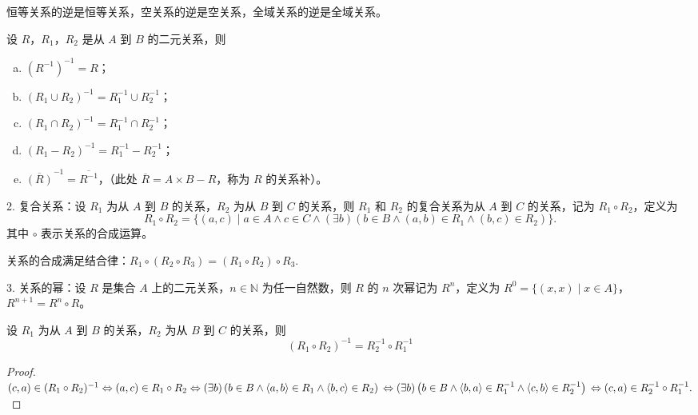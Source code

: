 \documentclass[normal,cyan]{elegantnote}
\begin{document}
\begin{note}
    恒等关系的逆是恒等关系，空关系的逆是空关系，全域关系的逆是全域关系。
\end{note}
\begin{theorem}
    设 $R$，$R_1$，$R_2$ 是从 $A$ 到 $B$ 的二元关系，则
    \begin{enumerate}[a)]
        \item $(R^{-1})^{-1} = R$；
        \item $(R_1 \cup R_2) ^{-1} = R_1^{-1} \cup R_2^{-1}$；
        \item $(R_1 \cap R_2) ^{-1} = R_1^{-1} \cap R_2^{-1}$；
        \item $(R_1 - R_2)^{-1} = R_1^{-1} - R_2^{-1}$；
        \item $\overline{(R)}^{-1} = \overline{R^{-1}}$，（此处 $\overline{R} = A \times B - R$，称为 $R$ 的{\color{red}关系补}）。
    \end{enumerate}
\end{theorem}
2. 复合关系：设 $R_1$ 为从 $A$ 到 $B$ 的关系，$R_2$ 为从 $B$ 到 $C$ 的关系，则 $R_1$ 和 $R_2$ 的{\color{red}复合关系}为从 $A$ 到 $C$ 的关系，记为 $R_1 \circ R_2$，定义为 $$R_1 \circ R_2 = \{(a, c) \mid a \in A \wedge c \in C \wedge (\exists b)(b \in B \wedge (a, b) \in R_1 \wedge (b, c) \in R_2)\}.$$ 其中 $\circ$ 表示{\color{red}关系的合成运算}。
\begin{note}
    关系的合成满足{\color{red}结合律}：$R_1 \circ (R_2 \circ R_3) = (R_1 \circ R_2) \circ R_3.$
\end{note}
3. 关系的幂：设 $R$ 是集合 $A$ 上的二元关系，$n \in \mathbb{N}$ 为任一自然数，则 $R$ 的 $n$ 次幂记为 $R^n$，定义为 $R^0 = \{(x, x) \mid x \in A\}$，$R^{n+1} = R^n \circ R$。
\begin{theorem}
    设 $R_1$ 为从 $A$ 到 $B$ 的关系，$R_2$ 为从 $B$ 到 $C$ 的关系，则 $$(R_1 \circ R_2)^{-1} = R_2^{-1} \circ R_1^{-1}$$
\end{theorem}
\begin{proof}
    $(c, a) \in (R_1 \circ R_2)^{-1} \\
    \Leftrightarrow (a, c) \in R_1 \circ R_2 \\
    \Leftrightarrow(\exists b)\left(b \in B \wedge\langle a, b\rangle \in R_{1} \wedge\langle b, c\rangle \in R_{2}\right) \\
    \Leftrightarrow(\exists b)\left(b \in B \wedge\langle b, a\rangle \in R_{1}^{-1} \wedge\langle c, b\rangle \in R_{2}^{-1}\right) \\
    \Leftrightarrow(c, a) \in R_{2}^{-1} \circ R_{1}^{-1}.$
\end{proof}
\end{document}
